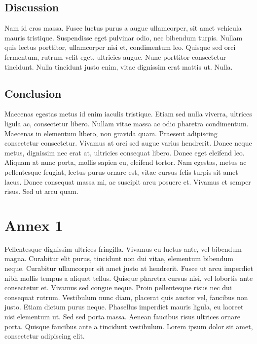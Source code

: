 \documentclass{jdmdh}
\begin{document}
\nocite{hentschel07acceptance,biodiversa,pubmed,antonymy02perspective,justeson01cooccurence,r-project}

\subsection{Discussion}
Nam id eros massa. Fusce luctus purus a augue ullamcorper, sit amet vehicula mauris
tristique. Suspendisse eget pulvinar odio, nec bibendum turpis. Nullam quis lectus porttitor,
ullamcorper nisi et, condimentum leo. Quisque sed orci fermentum, rutrum velit eget, ultricies
augue. Nunc porttitor consectetur tincidunt. Nulla tincidunt justo enim, vitae dignissim erat
mattis ut. Nulla.

\subsection{Conclusion}
Maecenas egestas metus id enim iaculis tristique. Etiam sed nulla viverra, ultrices ligula ac,
consectetur libero. Nullam vitae massa ac odio pharetra condimentum. Maecenas in
elementum libero, non gravida quam. Praesent adipiscing consectetur consectetur. Vivamus at
orci sed augue varius hendrerit. Donec neque metus, dignissim nec erat at, ultricies consequat
libero. Donec eget eleifend leo. Aliquam at nunc porta, mollis sapien eu, eleifend tortor. Nam
egestas, metus ac pellentesque feugiat, lectus purus ornare est, vitae cursus felis turpis sit amet
lacus. Donec consequat massa mi, ac suscipit arcu posuere et. Vivamus et semper risus. Sed ut
arcu quam.





\appendix\footnotesize

\section{Annex 1}
Pellentesque dignissim ultrices fringilla. Vivamus eu luctus ante, vel bibendum magna. Curabitur elit purus, tincidunt non dui
vitae, elementum bibendum neque. Curabitur ullamcorper sit amet justo at hendrerit. Fusce ut arcu imperdiet nibh mollis
tempus a aliquet tellus. Quisque pharetra cursus nisi, vel lobortis ante consectetur et. Vivamus sed congue neque. Proin
pellentesque risus nec dui consequat rutrum. Vestibulum nunc diam, placerat quis auctor vel, faucibus non justo. Etiam
dictum purus neque. Phasellus imperdiet mauris ligula, eu laoreet nisi elementum ut. Sed sed porta massa. Aenean faucibus
risus ultrices ornare porta. Quisque faucibus ante a tincidunt vestibulum. Lorem ipsum dolor sit amet, consectetur adipiscing
elit.
\end{document}
